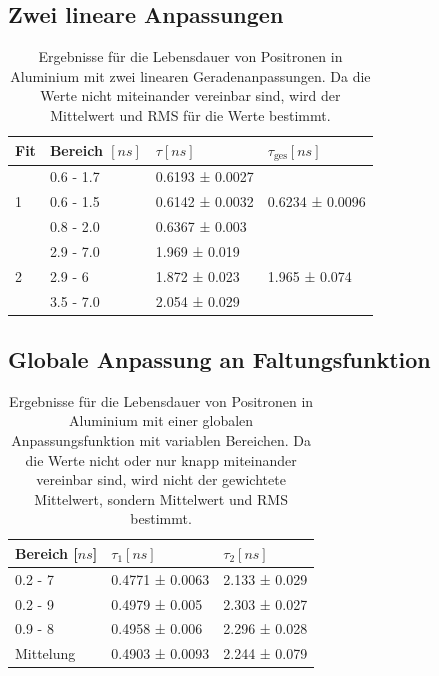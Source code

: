 \documentclass[a4paper,12pt]{article}
\begin{document}
\subsection{Zwei lineare Anpassungen}
\begin{table}[h]
	\begin{tabular}{l |l l ||l}
			Fit& Bereich $[\si{ns}]$ & $τ [\si{ns}]$ & $τ_\text{ges} [\si{ns}]$ \\
		\hline
		\multirow{3}{*}{1} & 0.6 - 1.7 &  0.6193 ± 0.0027   &\multirow{3}{*}{  0.6234 ± 0.0096}\\
	 & 0.6 - 1.5 &  0.6142 ± 0.0032   &\\
	 & 0.8 - 2.0 &  0.6367 ± 0.003   &\\
	 \hline
	 \multirow{3}{*}{2}  & 2.9 - 7.0 &  1.969 ± 0.019   &\multirow{3}{*}{1.965 ± 0.074 }\\
	 & 2.9 - 6 &  1.872 ± 0.023   &\\
	 & 3.5 - 7.0 &  2.054 ± 0.029   &
	\end{tabular}
	\centering
	\caption{Ergebnisse für die Lebensdauer von Positronen in Aluminium mit zwei linearen
		Geradenanpassungen. Da die Werte nicht miteinander vereinbar sind, wird der Mittelwert und
	RMS für die Werte bestimmt.}
	\label{tab:linearPoly}
\end{table}
\subsection{Globale Anpassung an Faltungsfunktion}

\begin{table}[h]
	\begin{tabular}{l |l l}
		Bereich [$\si{ns}$] & $τ_1 [\si{ns}]$ & $τ_2 [\si{ns}]$ \\
		\hline
0.2 - 7 &  0.4771 ± 0.0063   &  2.133 ± 0.029  \\
0.2 - 9 &  0.4979 ± 0.005   &  2.303 ± 0.027  \\
0.9 - 8 &  0.4958 ± 0.006   &  2.296 ± 0.028  \\
		\hline
		\hline
		Mittelung & 0.4903 ± 0.0093 & 2.244 ± 0.079
	\end{tabular}
	\centering
	\caption{Ergebnisse für die Lebensdauer von Positronen in Aluminium mit einer globalen
	Anpassungsfunktion mit variablen Bereichen. Da die Werte nicht oder nur knapp miteinander
		vereinbar sind, wird nicht der gewichtete Mittelwert, sondern Mittelwert und RMS bestimmt.}
	\label{tab:globalPoly}
\end{table}
\end{document}
